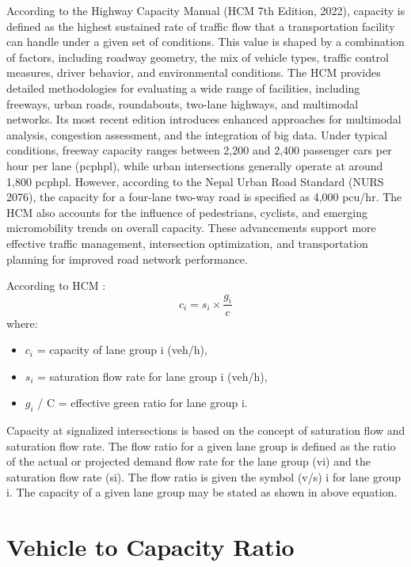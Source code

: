 According to the Highway Capacity Manual (HCM 7th Edition, 
2022), capacity is defined as the highest sustained rate of 
traffic flow that a transportation facility can handle under 
a given set of conditions. This value is shaped by a 
combination of factors, including roadway geometry, the mix 
of vehicle types, traffic control measures, driver behavior, 
and environmental conditions. The HCM provides detailed 
methodologies for evaluating a wide range of facilities, 
including freeways, urban roads, roundabouts, two-lane 
highways, and multimodal networks. Its most recent edition 
introduces enhanced approaches for multimodal analysis, 
congestion assessment, and the integration of big data. 
Under typical conditions, freeway capacity ranges between 
2,200 and 2,400 passenger cars per hour per lane (pcphpl), 
while urban intersections generally operate at around 1,800 
pcphpl. However, according to the Nepal Urban Road Standard 
(NURS 2076), the capacity for a four-lane two-way road is 
specified as 4,000 pcu/hr. The HCM also accounts for the 
influence of pedestrians, cyclists, and emerging 
micromobility trends on overall capacity. These advancements 
support more effective traffic management, intersection 
optimization, and transportation planning for improved road 
network performance.

According to HCM :
\begin{equation*}
    c_i = s_i \times \frac{g_i}{c}
\end{equation*}
where:
\begin{itemize}
    \item $c_i$ = capacity of lane group i (veh/h), 
    \item $s_i$ = saturation flow rate for lane group i (veh/h), 
    \item $g_i$ / C = effective green ratio for lane group i.
\end{itemize}

Capacity at signalized intersections is based on the concept 
of saturation flow and saturation flow rate. The flow ratio 
for a given lane group is defined as the ratio of the actual 
or projected demand flow rate for the lane group (vi) and 
the saturation flow rate (si). The flow ratio is given the 
symbol (v/s) i for lane group i. The capacity of a given 
lane group may be stated as shown in above equation.

\section{Vehicle to Capacity Ratio}

